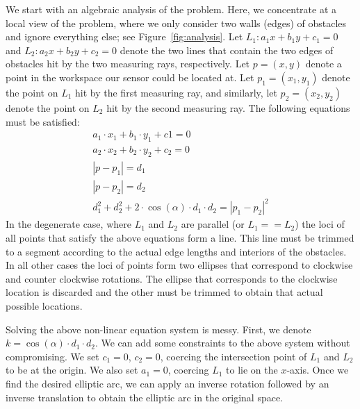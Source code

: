 We start with an algebraic analysis of the problem. Here, we concentrate at a local view of the problem, where we only consider two walls (edges) of obstacles and ignore everything else; see Figure~\ref{fig:analysis}. Let $L_1: a_1 x + b_1 y + c_1 = 0$ and $L_2: a_2 x + b_2 y + c_2 = 0$ denote the two lines that contain the two edges of obstacles hit by the two measuring rays, respectively. Let $p = (x,y)$ denote a point in the workspace our sensor could be located at. Let $p_1 = (x_1,y_1)$ denote the point on $L_1$ hit by the first measuring ray, and similarly, let $p_2 = (x_2,y_2)$ denote the point on $L_2$ hit by the second measuring ray. The following equations must be satisfied:
\begin{gather}
  a_1\cdot x_1 + b_1\cdot y_1 + c1 = 0\\
  a_2\cdot x_2 + b_2\cdot y_2 + c_2 = 0\\
  |p - p_1| = d_1\\
  |p - p_2| = d_2\\
  d_1^2 + d_2^2 + 2\cdot \cos(\alpha)\cdot d_1\cdot d_2 = |p_1 - p_2|^2
\end{gather}
In the degenerate case, where $L_1$ and $L_2$ are parallel (or $L_1 == L_2$) the loci of all points that satisfy the above equations form a line. This line must be trimmed to a segment according to the actual edge lengths and interiors of the obstacles. In all other cases the loci of points form two ellipses that correspond to clockwise and counter clockwise rotations. The ellipse that corresponds to the clockwise location is discarded and the other must be trimmed to obtain that actual possible locations.

Solving the above non-linear equation system is messy. First, we denote $k = \cos(\alpha)\cdot d_1\cdot d_2$. We can add some constraints to the above system without compromising. We set $c_1 = 0$, $c_2 = 0$, coercing the intersection point of $L_1$ and $L_2$ to be at the origin. We also set $a_1 = 0$, coercing $L_1$ to lie on the $x$-axis. Once we find the desired elliptic arc, we can apply an inverse rotation followed by an inverse translation to obtain the elliptic arc in the original space.

